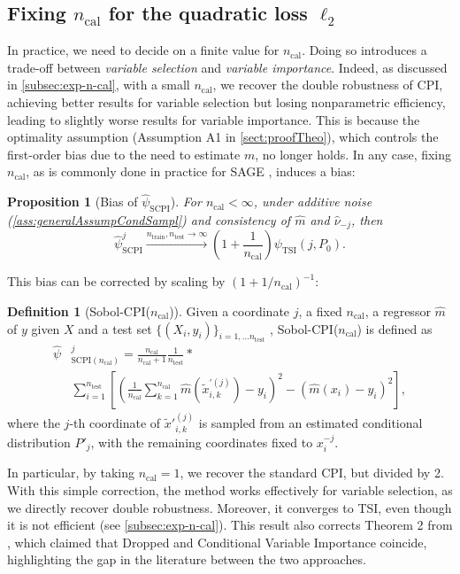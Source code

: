\documentclass{article}
\theoremstyle{plain}
\newtheorem{proposition}[theorem]{Proposition}
\theoremstyle{definition}
\newtheorem{definition}[theorem]{Definition}
\theoremstyle{remark}
\begin{document}
\subsection{Fixing $n_\mathrm{cal}$ for the quadratic loss $\ell_2$}\label{subsec:fix-n-cal}
In practice, we need to decide on a finite value for $n_\mathrm{cal}$. Doing so introduces a trade-off between \textit{variable selection} and \textit{variable importance}. Indeed, as discussed in \cref{subsec:exp-n-cal}, with a small $n_\mathrm{cal}$, we recover the double robustness of CPI, achieving better results for variable selection but losing nonparametric efficiency, leading to slightly worse results for variable importance. This is because the optimality assumption (Assumption A1 in \cref{sect:proofTheo}), which controls the first-order bias due to the need to estimate $m$, no longer holds.
In any case, fixing $n_\mathrm{cal}$, as is commonly done in practice for SAGE \cite{covert}, induces a bias:

\begin{proposition}[Bias of $\widehat{\psi}_\mathrm{SCPI}$]\label{prop:fix_n_cal} For $n_\mathrm{cal}<\infty$, under additive noise (\ref{ass:generalAssumpCondSampl}) and consistency of $\widehat{m}$ and $\widehat{\nu}_{-j}$, then $$\widehat{\psi}_{\mathrm{SCPI}}^j\xrightarrow{n_\mathrm{train}, n_\mathrm{test}\to\infty}\left(1+\frac{1}{n_{\mathrm{cal}}}\right)\psi_\mathrm{TSI}(j, P_0).$$
\end{proposition}
%
This bias can be corrected by scaling by $(1+1/n_\mathrm{cal})^{-1}$:
%
\begin{definition}[Sobol-CPI($n_\mathrm{cal}$)] Given a coordinate $j$, a fixed $n_\mathrm{cal}$, a regressor $\widehat{m}$ of $y$ given $X$ and a test set $\{(X_i, y_i)\}_{i=1,\ldots n_\mathrm{test}}$ , Sobol-CPI($n_\mathrm{cal}$) is defined as
\begin{align*}
    \widehat{\psi}&_{\mathrm{SCPI}(n_\mathrm{cal})}^j=\frac{n_\mathrm{cal}}{n_\mathrm{cal}+1}\frac{1}{n_{\mathrm{test}}}*\\&\sum_{i=1}^{n_{\mathrm{test}}}\left[\left(\frac{1}{n_\mathrm{cal}}\sum_{k=1}^{n_\mathrm{cal}}\widehat{m}(\widetilde{x}^{'(j)}_{i,k})-y_i\right)^2-\left(\widehat{m}(x_i)- y_i\right)^2\right],
\end{align*}
where the $j$-th coordinate of $\widetilde{x}'^{(j)}_{i,k}$ is sampled from an estimated conditional distribution $P'_j$, with the remaining coordinates fixed to $x_i^{-j}$.
%
\end{definition}
%
In particular, by taking $n_\mathrm{cal}=1$, we recover the standard CPI, but divided by 2. With this simple correction, the method works effectively for variable selection, as we directly recover double robustness. Moreover, it converges to TSI, even though it is not efficient (see \cref{subsec:exp-n-cal}). This result also corrects Theorem 2 from \citet{Hooker2021}, which claimed that Dropped and Conditional Variable Importance coincide, highlighting the gap in the literature between the two approaches.
\end{document}
